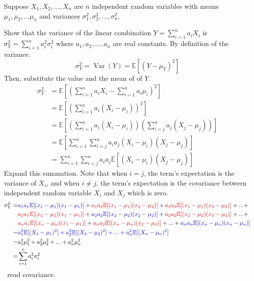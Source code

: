 \documentclass[11pt,a4paper,fleqn]{article}
\numberwithin{equation}{section}
\DeclareMathOperator\Var{\mathrm{Var}}
\newcommand{\TODO}{\textcolor{ErrorRed}{\fbox{TODO}}\ }
\begin{document}
\begin{exec}
    Suppose $X_1,X_2,...,X_n$ are $n$ independent random variables with means $\mu_1,\mu_2,...\mu_n$ and variances $\sigma_1^2,\sigma_2^2,...,\sigma_n^2$.

    Show that the variance of the linear combination $Y=\sum_{i=1}^{n}a_iX_i$ is $\sigma_Y^2=\sum_{i=1}^{n}a_i^2\sigma_i^2$ where $a_1,a_2,...,a_n$ are real constants.
    \tcblower
    By definition of the variance.
    \begin{equation*}
        \sigma_Y^2=\Var(Y)=\mathbb{E}[(Y-\mu_Y)^2]
    \end{equation*}
    Then, substitute the value and the mean of of $Y$.
    \begin{align*}
        \sigma_Y^2
        &=\mathbb{E}\left[\left(\sum_{i=1}^{n}a_iX_i-\sum_{i=1}^{n}a_i\mu_i\right)^2\right]\\
        &=\mathbb{E}\left[\left(\sum_{i=1}^{n}a_i(X_i-\mu_i)\right)^2\right]\\
        &=\mathbb{E}\left[\left(\sum_{i=1}^{n}a_i(X_i-\mu_i)\right) \left(\sum_{i=j}^{n}a_j(X_j-\mu_j)\right)\right]\\
        &=\mathbb{E}\left[\sum_{i=1}^{n}\sum_{i=j}^{n}a_ia_j(X_i-\mu_i)(X_j-\mu_j) \right]\\
        &=\sum_{i=1}^{n}\sum_{i=j}^{n}a_ia_j\mathbb{E}\left[(X_i-\mu_i)(X_j-\mu_j) \right]
    \end{align*}
    Expand this summation. Note that when $i=j$, the term's expectation is the variance of $X_i$, and when $i\neq j$, the term's expectation is the covariance between independent random variable $X_i$ and $X_j$ which is zero.
    \begin{align*}
        \sigma_Y^2
        =&\mathcolor{blue}{a_1a_1\mathbb{E}[(x_1-\mu_1)(x_1-\mu_1)]}+
        \mathcolor{red}{a_1a_2\mathbb{E}[(x_1-\mu_1)(x_2-\mu_2)]}+
        \mathcolor{red}{a_1a_3\mathbb{E}[(x_1-\mu_1)(x_3-\mu_3)]}+ ... +\\
        &\mathcolor{red}{a_2a_1\mathbb{E}[(x_2-\mu_2)(x_1-\mu_1)]}+
        \mathcolor{blue}{a_2a_2\mathbb{E}[(x_2-\mu_2)(x_2-\mu_2)]}+
        \mathcolor{red}{a_2a_2\mathbb{E}[(x_2-\mu_2)(x_3-\mu_3)]}+ ... +\\
        &\mathcolor{red}{a_na_1\mathbb{E}[(x_n-\mu_n)(x_1-\mu_1)]}+
        \mathcolor{red}{a_na_2\mathbb{E}[(x_n-\mu_n)(x_2-\mu_2)]}+...+
        \mathcolor{blue}{a_na_n\mathbb{E}[(x_n-\mu_n)(x_n-\mu_n)]}\\
        =&\mathcolor{blue}{a_1^2\mathbb{E}[(X_1-\mu_1)^2]+a_2^2\mathbb{E}[(X_2-\mu_2)^2]+...+a_n^2\mathbb{E}[(X_n-\mu_n)^2]}\\
        =&a_1^2\mu_1^2+a_2^2\mu_2^2+...+a_n^2\mu_n^2\\
        =&\sum_{i=1}^{n}a_i^2\sigma_i^2
    \end{align*}
    \TODO read covariance.
\end{exec}
\end{document}
